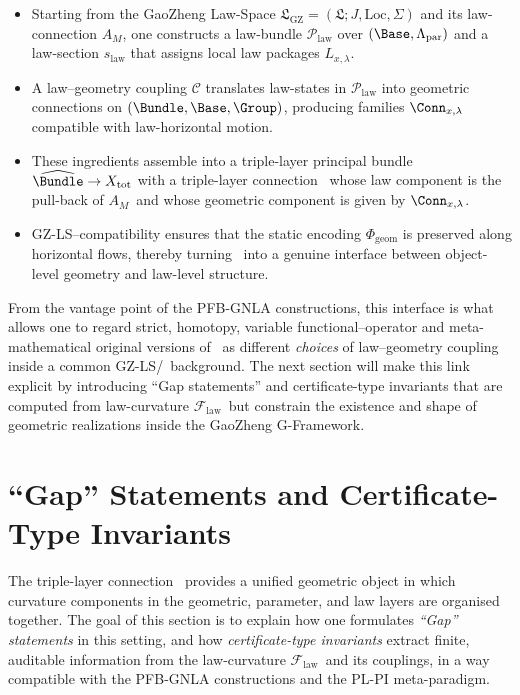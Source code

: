 \documentclass[11pt]{book}
\theoremstyle{plain}
\theoremstyle{definition}
\newcommand{\GZLS}{\ensuremath{\mathfrak{L}_{\mathrm{GZ}}}}       \newcommand{\GZLT}{\ensuremath{M_{!w}}}                           \newcommand{\GZLOC}{\ensuremath{A_M}}                             \newcommand{\GZLCurv}{\ensuremath{\mathcal{F}_{\mathrm{law}}}}
\begin{document}
\begin{itemize}
  \item Starting from the GaoZheng Law-Space
        $\GZLS=(\mathfrak{L};J,\mathrm{Loc},\Sigma)$ and its
        law-connection \GZLOC, one constructs a law-bundle
        $\mathcal{P}_{\mathrm{law}}$ over $(\Base,\Lambda_{\mathrm{par}})$
        and a law-section $s_{\mathrm{law}}$ that assigns local law
        packages $L_{x,\lambda}$.
  \item A law–geometry coupling $\mathcal{C}$ translates law-states in
        $\mathcal{P}_{\mathrm{law}}$ into geometric connections on
        $(\Bundle,\Base,\Group)$, producing families
        $\Conn_{x,\lambda}$ compatible with law-horizontal motion.
  \item These ingredients assemble into a triple-layer principal bundle
        $\widehat{\Bundle}\to X_{\mathrm{tot}}$ with a triple-layer
        connection \GZTLC\ whose law component is the pull-back of
        \GZLOC\ and whose geometric component is given by $\Conn_{x,\lambda}$.
  \item GZ-LS–compatibility ensures that the static encoding
        $\Phi_{\mathrm{geom}}$ is preserved along horizontal flows,
        thereby turning \GZTLC\ into a genuine interface between
        object-level geometry and law-level structure.
\end{itemize}

From the vantage point of the PFB-GNLA constructions, this interface is
what allows one to regard strict, homotopy, variable functional–operator
and meta-mathematical original versions of \GAlgebra\ as different
\emph{choices} of law–geometry coupling inside a common GZ-LS/\GZTLC\
background. The next section will make this link explicit by introducing
“Gap statements” and certificate-type invariants that are computed from
law-curvature \GZLCurv\ but constrain the existence and shape of
geometric realizations inside the GaoZheng G-Framework.



\section{“Gap” Statements and Certificate-Type Invariants}


The triple-layer connection \GZTLC\ provides a unified geometric object
in which curvature components in the geometric, parameter, and law
layers are organised together. The goal of this section is to explain
how one formulates \emph{“Gap” statements} in this setting, and how
\emph{certificate-type invariants} extract finite, auditable information
from the law-curvature \GZLCurv\ and its couplings, in a way compatible
with the PFB-GNLA constructions and the PL-PI meta-paradigm.
\end{document}
